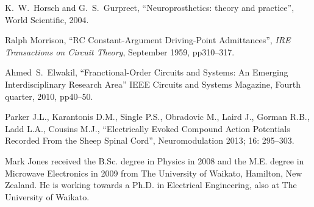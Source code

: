 \documentclass[journal, a4paper]{IEEEtran}
\begin{document}
\begin{thebibliography}{99}
    K.~W.~Horsch and G.~S.~Gurpreet,
    ``Neuroprosthetics: theory and practice'',
    World Scientific, 2004.

    Ralph Morrison,
    ``RC Constant-Argument Driving-Point Admittances'',
    {\em IRE Transactions on Circuit Theory},
    September 1959, pp310--317.

    Ahmed~S.~Elwakil,
    ``Franctional-Order Circuits and Systems: An Emerging Interdisciplinary Research Area''
    IEEE Circuits and Systems Magazine, Fourth quarter, 2010, pp40--50.

    Parker J.L., Karantonis D.M., Single P.S., Obradovic M., Laird J., Gorman R.B., Ladd L.A., Cousins M.J.,
    ``Electrically Evoked Compound Action Potentials Recorded From the Sheep Spinal Cord'',
    Neuromodulation 2013; 16: 295--303.





\end{thebibliography}

\begin{IEEEbiography}{Mark Jones}
received the B.Sc. degree in Physics in 2008 and the M.E. degree in Microwave Electronics in 2009 from The University of Waikato, Hamilton, New Zealand.
He is working towards a Ph.D. in Electrical Engineering, also at The University of Waikato.
\end{IEEEbiography}
\end{document}
